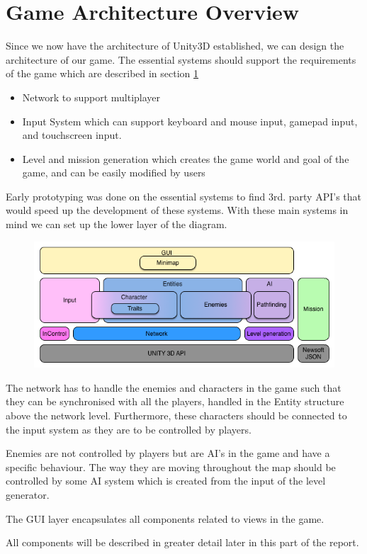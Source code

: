 \section{Game Architecture Overview}
Since we now have the architecture of Unity3D established, we can design the architecture of our game.
The essential systems should support the requirements of the game which are described in section \ref{} 
\begin{itemize}
    \item Network to support multiplayer
    \item Input System which can support keyboard and mouse input, gamepad input, and touchscreen input.
    \item Level and mission generation which creates the game world and goal of the game, and can be easily modified by users
\end{itemize}
Early prototyping was done on the essential systems to find 3rd. party API's that would speed up the development of these systems.
With these main systems in mind we can set up the lower layer of the diagram.

\begin{figure}
\includegraphics[width = \textwidth]{figures/architecture/game_architecture_overview.png}
\end{figure}

The network has to handle the enemies and characters in the game such that they can be synchronised with all the players, handled in the Entity structure above the network level.
Furthermore, these characters should be connected to the input system as they are to be controlled by players.

Enemies are not controlled by players but are AI's in the game and have a specific behaviour.
The way they are moving throughout the map should be controlled by some AI system which is created from the input of the level generator.

The GUI layer encapsulates all components related to views in the game.

All components will be described in greater detail later in this part of the report.
